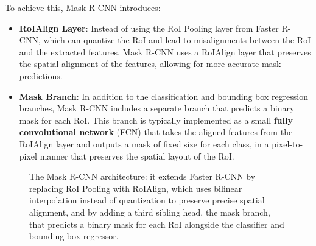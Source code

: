 To achieve this, Mask R-CNN introduces:
\begin{itemize}
    \item \textbf{RoIAlign Layer}: Instead of using the RoI Pooling layer from Faster R-CNN,
    which can quantize the RoI and lead to misalignments between the RoI and the extracted features,
    Mask R-CNN uses a RoIAlign layer that preserves the spatial alignment of the features, allowing for more accurate mask predictions.
    
    \item \textbf{Mask Branch}: In addition to the classification and bounding box regression branches, Mask R-CNN includes a separate branch that predicts a binary mask for each RoI.
    This branch is typically implemented as a small \textbf{fully convolutional network} (FCN) that takes the aligned features from the RoIAlign layer and outputs a mask of fixed size for each class, in a pixel-to-pixel manner that preserves the spatial layout of the RoI.
\end{itemize}

\begin{figure}[H]
    \centering
    \resizebox{\textwidth}{!}{}
    \caption{The Mask R-CNN architecture: it extends Faster R-CNN by replacing RoI Pooling with RoIAlign, which uses bilinear interpolation instead of quantization to preserve precise spatial alignment, and by adding a third sibling head, the mask branch, that predicts a binary mask for each RoI alongside the classifier and bounding box regressor.}
    \label{fig:mask-rcnn-architecture}
\end{figure}